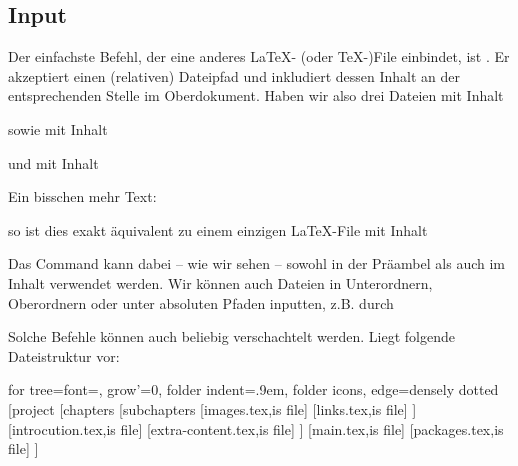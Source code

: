 \subsection{Input}
Der einfachste Befehl, der eine anderes \LaTeX{}- (oder \TeX{}-)File einbindet, ist .
Er akzeptiert einen (relativen) Dateipfad und inkludiert dessen Inhalt an der entsprechenden Stelle im Oberdokument.
Haben wir also drei Dateien  mit Inhalt
sowie  mit Inhalt
\begin{latexlisting}
	\usepackage{blindtext}
\end{latexlisting}
und  mit Inhalt
\begin{latexlisting}
	Ein bisschen mehr Text: \blindtext
\end{latexlisting}
so ist dies exakt äquivalent zu einem einzigen \LaTeX{}-File  mit Inhalt
Das Command  kann dabei -- wie wir sehen -- sowohl in der Präambel als auch im Inhalt verwendet werden.
Wir können auch Dateien in Unterordnern, Oberordnern oder unter absoluten Pfaden inputten, z.B. durch
\begin{latexlisting}
\end{latexlisting}
Solche Befehle können auch beliebig verschachtelt werden.
Liegt folgende Dateistruktur vor:
\begin{center}
	\begin{forest}
	for tree={font=\sffamily, grow'=0,
	folder indent=.9em, folder icons,
	edge=densely dotted}
	[project
		[chapters
			[subchapters
				[images.tex,is file]
				[links.tex,is file]
			]
			[introcution.tex,is file]
			[extra-content.tex,is file]
		]
		[main.tex,is file]
		[packages.tex,is file]
	]
	\end{forest}
\end{center}
